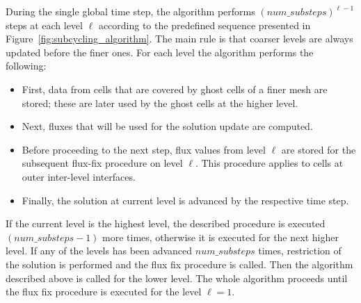 During the single global time step, the algorithm performs
${(num\_substeps)}^{\ell-1}$ steps at each level $\ell$ according to
the predefined sequence presented in
Figure~\ref{fig:subcycling_algorithm}. The main rule is that coarser
levels are always updated before the finer ones. For each level the
algorithm performs the following:
\begin{itemize}
\item First, data from cells that are covered by ghost cells of a
  finer mesh are stored; these are later used by the ghost cells at
  the higher level.
\item Next, fluxes that will be used for the solution update are computed.
\item Before proceeding to the next step, flux values from level
  $\ell$ are stored for the subsequent flux-fix procedure on level
  $\ell$. This procedure applies to cells at outer inter-level
  interfaces.
\item Finally, the solution at current level is advanced by the
  respective time step.
\end{itemize}
If the current level is the highest level, the described procedure is
executed $(num\_substeps-1)$ more times, otherwise it is executed for
the next higher level. If any of the levels has been advanced
$num\_substeps$ times, restriction of the solution is performed and
the flux fix procedure is called. Then the algorithm described above
is called for the lower level. The whole algorithm proceeds until the
flux fix procedure is executed for the level $\ell=1$.

